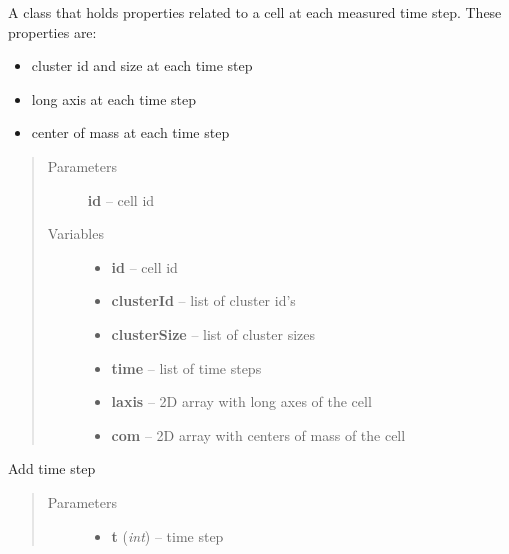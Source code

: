 \documentclass[letterpaper,10pt,english]{sphinxmanual}
\begin{document}

\begin{fulllineitems}
\label{AnalysisUtils:AnalysisUtils.ClusterCellTC}
A class that holds properties related to a cell at each measured time step. These properties are:
\begin{itemize}
\item {} 
cluster id and size at each time step

\item {} 
long axis at each time step

\item {} 
center of mass at each time step

\end{itemize}
\begin{quote}\begin{description}
\item[{Parameters}] \leavevmode
\textbf{id} -- cell id

\item[{Variables}] \leavevmode\begin{itemize}
\item {} 
\textbf{id} -- cell id

\item {} 
\textbf{clusterId} -- list of cluster id's

\item {} 
\textbf{clusterSize} -- list of cluster sizes

\item {} 
\textbf{time} -- list of time steps

\item {} 
\textbf{laxis} -- 2D array with long axes of the cell

\item {} 
\textbf{com} -- 2D array with centers of mass of the cell

\end{itemize}

\end{description}\end{quote}

\begin{fulllineitems}
\label{AnalysisUtils:AnalysisUtils.ClusterCellTC.addTimeStep}
Add time step
\begin{quote}\begin{description}
\item[{Parameters}] \leavevmode\begin{itemize}
\item {} 
\textbf{t} (\emph{int}) -- time step


\end{itemize}
\end{description}
\end{quote}
\end{fulllineitems}
\end{fulllineitems}
\end{document}
